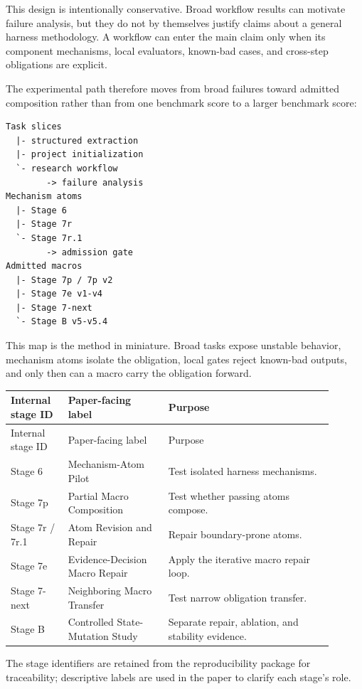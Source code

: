 \documentclass[11pt]{article}
\begin{document}
This design is intentionally conservative. Broad workflow results can motivate failure analysis, but they do not by themselves justify claims about a general harness methodology. A workflow can enter the main claim only when its component mechanisms, local evaluators, known-bad cases, and cross-step obligations are explicit.

The experimental path therefore moves from broad failures toward admitted composition rather than from one benchmark score to a larger benchmark score:

\begin{verbatim}
Task slices
  |- structured extraction
  |- project initialization
  `- research workflow
        -> failure analysis
Mechanism atoms
  |- Stage 6
  |- Stage 7r
  `- Stage 7r.1
        -> admission gate
Admitted macros
  |- Stage 7p / 7p v2
  |- Stage 7e v1-v4
  |- Stage 7-next
  `- Stage B v5-v5.4
\end{verbatim}

This map is the method in miniature. Broad tasks expose unstable behavior, mechanism atoms isolate the obligation, local gates reject known-bad outputs, and only then can a macro carry the obligation forward.

{\small
\setlength{\tabcolsep}{3pt}
\begin{longtable}{>{\raggedright\arraybackslash}p{0.160\linewidth}>{\raggedright\arraybackslash}p{0.280\linewidth}>{\raggedright\arraybackslash}p{0.460\linewidth}}
\toprule
Internal stage ID & Paper-facing label & Purpose \\
\midrule
\endfirsthead
\toprule
Internal stage ID & Paper-facing label & Purpose \\
\midrule
\endhead
Stage 6 & Mechanism-Atom Pilot & Test isolated harness mechanisms. \\
Stage 7p & Partial Macro Composition & Test whether passing atoms compose. \\
Stage 7r / 7r.1 & Atom Revision and Repair & Repair boundary-prone atoms. \\
Stage 7e & Evidence-Decision Macro Repair & Apply the iterative macro repair loop. \\
Stage 7-next & Neighboring Macro Transfer & Test narrow obligation transfer. \\
Stage B & Controlled State-Mutation Study & Separate repair, ablation, and stability evidence. \\
\bottomrule
\end{longtable}
}

The stage identifiers are retained from the reproducibility package for traceability; descriptive labels are used in the paper to clarify each stage's role.
\end{document}
